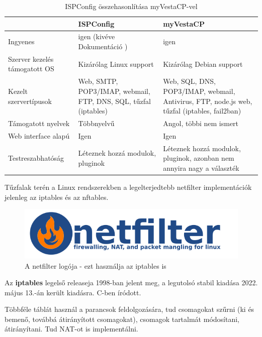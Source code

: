 \begin{table}[h]
\centering
\caption{ISPConfig \cite{ispconfig2} összehasonlítása myVestaCP-vel \cite{myvestacp}}
\label{tab:ispconfig_vs_myvestacp}
\begin{tabularx}{\linewidth}{l|L|L}
 & ISPConfig & myVestaCP \\
\hline
Ingyenes & igen (kivéve Dokumentáció \cite{ispconfig_doc}) & igen \\
\hline
Szerver kezelés támogatott OS & Kizárólag Linux support & Kizárólag Debian support \\
\hline
Kezelt szervertípusok & Web, SMTP, POP3/IMAP, webmail, FTP, DNS, SQL, tűzfal (iptables) & Web, SQL, DNS, POP3/IMAP, webmail, Antivirus, FTP, node.js web, tűzfal (iptables, fail2ban) \cite{vestacpdocs} \\
\hline
Támogatott nyelvek & Többnyelvű & Angol, többi nem ismert \\
\hline
Web interface alapú & Igen & Igen \\
\hline
Testreszabhatóság & Léteznek hozzá modulok, pluginok & Léteznek hozzá modulok, pluginok, azonban nem annyira nagy a választék \\
\end{tabularx}
\end{table}

Tűzfalak terén a Linux rendszerekben a legelterjedtebb netfilter implementációk jelenleg az iptables és az nftables. 

\begin{figure}[h]
\centering
\includegraphics[scale=0.5]{images/netfilter-logo3.png}
\caption{A netfilter logója - ezt használja az iptables is}
\end{figure}

Az \textbf{iptables} legelső releaseja 1998-ban jelent meg, a legutolsó stabil kiadása 2022. május 13.-án került kiadásra. C-ben íródott. \cite{iptables}

Többféle táblát használ a parancsok feldolgozására, tud csomagokat szűrni (ki és bemenő, továbbá átirányított csomagokat), csomagok tartalmát módosítani, átirányítani. Tud NAT-ot is implementálni. \cite{iptables_man}

